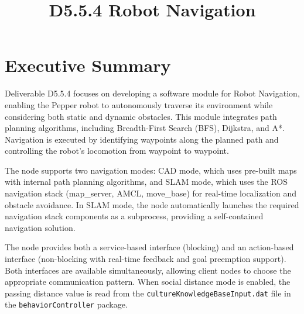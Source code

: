 \documentclass{CSSRforAfrica}
\begin{document}



\title{D5.5.4 Robot Navigation}   




\maketitle

\section*{Executive Summary}
\label{executive_summary}

Deliverable D5.5.4 focuses on developing a software module for Robot Navigation, enabling the Pepper robot to autonomously traverse its environment while considering both static and dynamic obstacles. This module integrates path planning algorithms, including Breadth-First Search (BFS), Dijkstra, and A*. Navigation is executed by identifying waypoints along the planned path and controlling the robot's locomotion from waypoint to waypoint.

\noindent The node supports two navigation modes: CAD mode, which uses pre-built maps with internal path planning algorithms, and SLAM mode, which uses the ROS navigation stack (map\_server, AMCL, move\_base) for real-time localization and obstacle avoidance. In SLAM mode, the node automatically launches the required navigation stack components as a subprocess, providing a self-contained navigation solution.

\noindent The node provides both a service-based interface (blocking) and an action-based interface (non-blocking with real-time feedback and goal preemption support). Both interfaces are available simultaneously, allowing client nodes to choose the appropriate communication pattern. When social distance mode is enabled, the passing distance value is read from the \texttt{cultureKnowledgeBaseInput.dat} file in the \texttt{behaviorController} package.
\end{document}
